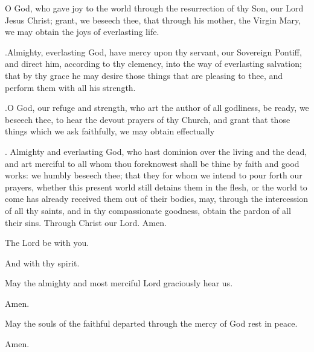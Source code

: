 {

\noindent O God, who gave joy to the world through the resurrection of thy Son, our Lord Jesus Christ; grant, we beseech thee, that through his mother, the Virgin Mary, we may obtain the joys of everlasting life.

.\@ Almighty, everlasting God, have mercy upon thy servant, \nomen{} our Sovereign Pontiff, and direct him, according to thy clemency, into the way of everlasting salvation; that by thy grace he may desire those things that are pleasing to thee, and perform them with all his strength.

.\@ O God, our refuge and strength, who art the author of all godliness, be ready, we beseech thee, to hear the devout prayers of thy Church, and grant that those things which we ask faithfully, we may obtain effectually

. Almighty and everlasting God, who hast dominion over the living and the dead, and art merciful to all whom thou foreknowest shall be thine by faith and good works: we humbly beseech thee; that they for whom we intend to pour forth our prayers, whether this present world still detains them in the flesh, or the world to come has already received them out of their bodies, may, through the intercession of all thy saints, and in thy compassionate goodness, obtain the pardon of all their sins. Through Christ our Lord. Amen.

\noindent	\vv The Lord be with you.
	
\noindent \rr And with thy spirit.


\noindent	\vv May the almighty and most merciful Lord graciously hear us.

\noindent \rr  Amen.


\noindent \vv May the souls of the faithful departed through the mercy of God rest in peace.

\noindent \rr Amen.


}